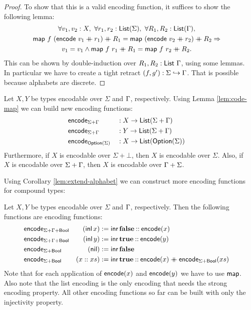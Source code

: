 \documentclass{psartcl}
\begin{document}
\begin{proof}
  To show that this is a valid encoding function, it suffices to show the following lemma:
  \begin{multline*}
    \forall v_1,v_2:X,~\forall r_1, r_2:\List(\Sigma),~\forall R_1, R_2:\List(\Tau),\\
    \map~f~(\MS{encode}~v_1 \app r_1) \app R_1 = \map~(\MS{encode}~v_2 \app r_2) \app R_2 \Rightarrow \\
    v_1 = v_1 \land \map~f~r_1 \app R_1 = \map~f~r_2 \app R_2.
  \end{multline*}
  This can be shown by double-induction over $R_1, R_2:\textsf{List}~\Gamma$, using some lemmas.
  In particular we have to create a tight retract $(f, g') : \Sigma \hookrightarrow \Gamma$.
  That is possible because alphabets are discrete.
\end{proof}


\begin{corollary}
  \label{lem:extend-alphabet}
  Let $X, Y$ be types encodable over $\Sigma$ and $\Gamma$, respectively.
  Using Lemma \ref{lem:code-map} we can build new encoding functions:
  \begin{alignat*}{3}
    \textsf{encode}&_{\Sigma + \Gamma}    &&: X \rightarrow \textsf{List}(\Sigma + \Gamma) \\
    \textsf{encode}&_{\Sigma + \Gamma}    &&: Y \rightarrow \textsf{List}(\Sigma + \Gamma) \\
    \textsf{encode}&_{\textsf{Option}(\Sigma)}  &&: X \rightarrow \textsf{List}(\textsf{Option}(\Sigma))
  \end{alignat*}
  Furthermore, if $X$ is encodable over $\Sigma+\bot$, then $X$ is encodable over $\Sigma$.
  Also, if $X$ is encodable over $\Sigma+\Gamma$, then $X$ is encodable over $\Gamma+\Sigma$.
\end{corollary}

Using Corollary \ref{lem:extend-alphabet} we can construct more encoding functions for compound types:
\begin{corollary}
  \label{lem:code-compound}
  Let $X, Y$ be types encodable over $\Sigma$ and $\Gamma$, respectively.
  Then the following functions are encoding functions:
  \begin{alignat*}{3}
    \textsf{encode}&_{\Sigma + \Gamma + \textsf{Bool}}&(\operatorname{\textsf{inl}} x) &:= \operatorname{\textsf{inr}} \mathbf{false} \mathbin{::} \textsf{encode}(x) \\
    \textsf{encode}&_{\Sigma + \Gamma + \textsf{Bool}}&(\operatorname{\textsf{inl}} y) &:= \operatorname{\textsf{inr}} \mathbf{true}  \mathbin{::} \textsf{encode}(y) \\
    \textsf{encode}&_{\Sigma + \textsf{Bool}}& (\textsf{nil})         &:= \operatorname{\textsf{inr}} \mathbf{false} \\
    \textsf{encode}&_{\Sigma + \textsf{Bool}}& (x :: xs)      &:= \operatorname{\textsf{inr}} \mathbf{true} \mathbin{::} \textsf{encode}(x) \mathbin{+\mkern-10mu+} \textsf{encode}_{\Sigma + \textsf{Bool}}(xs)
  \end{alignat*}
  Note that for each application of $\textsf{encode}(x)$ and $\textsf{encode}(y)$ we have to use $\textsf{map}$.
  Also note that the list encoding is the only encoding that needs the strong encoding property.  All other encoding functions so far can be built
  with only the injectivity property.
\end{corollary}
\end{document}

